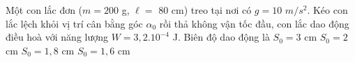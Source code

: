 \begin{ex}%
Một con lắc đơn ($m = 200$ g, $\ell =$ 80 cm) treo tại nơi có $g = 10$ $m/s^2$. Kéo con lắc lệch khỏi vị trí cân bằng góc $\alpha_0$ rồi thả không vận tốc đầu, con lắc dao động điều hoà với năng lượng $W = 3,2.10^{-4}$ J. Biên độ dao động là
\choice
{$S_0 = 3$ cm}
{$S_0= 2$ cm}
{$S_0= 1,8$ cm}
{\True $S_0= 1,6$ cm}
\end{ex} 

